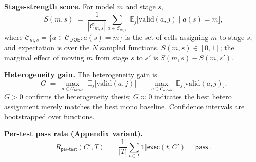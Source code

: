 
\textbf{Stage-strength score.} For model $m$ and stage $s$,
\begin{equation}
  S(m, s)
  \;=\;
  \frac{1}{|\mathcal{C}_{m,s}|}
  \sum_{a \in \mathcal{C}_{m,s}}
  \;
  \mathbb{E}_{j}\!\bigl[\text{valid}(a, j) \;\big|\; a(s) = m\bigr],
  \label{eq:stagestrength}
\end{equation}
where $\mathcal{C}_{m,s} = \{a \in \mathcal{C}_{\textsf{DOE}} : a(s) = m\}$
is the set of cells assigning $m$ to stage $s$, and expectation is over
the $N$ sampled functions. $S(m, s) \in [0, 1]$; the marginal effect of
moving $m$ from stage $s$ to $s'$ is $S(m, s) - S(m, s')$.


\textbf{Heterogeneity gain.} The heterogeneity gain is
\begin{equation}
  G
  \;=\;
  \max_{a \in \mathcal{C}_{\textsf{hetero}}}
  \;
  \mathbb{E}_{j}\!\bigl[\text{valid}(a, j)\bigr]
  \;-\;
  \max_{a \in \mathcal{C}_{\textsf{mono}}}
  \;
  \mathbb{E}_{j}\!\bigl[\text{valid}(a, j)\bigr].
  \label{eq:heterogain}
\end{equation}
$G > 0$ confirms the heterogeneity thesis; $G \approx 0$ indicates the
best hetero assignment merely matches the best mono baseline. Confidence
intervals are bootstrapped over functions.


\textbf{Per-test pass rate (Appendix variant).}
\begin{equation}
  R_{\textsf{per-test}}(C', T)
  \;=\;
  \frac{1}{|T|}
  \sum_{t \in T}
  \mathds{1}\!\bigl[\textsf{exec}(t, C') = \textsf{pass}\bigr].
  \label{eq:passrate_fine}
\end{equation}


